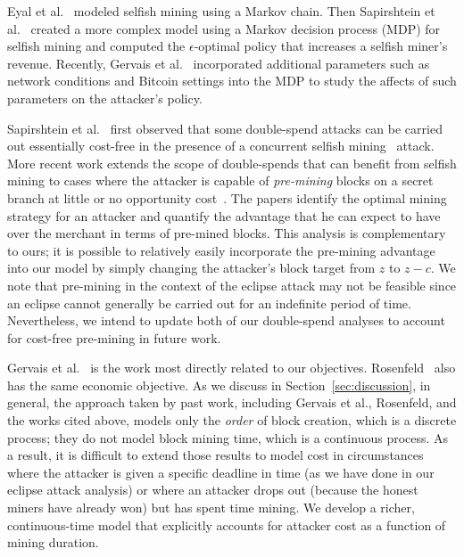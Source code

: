 Eyal et al.~\cite{eyal:2014} modeled selfish mining using a Markov chain. Then Sapirshtein et al.~\cite{sapirshtein:2015} created a more complex model using a Markov decision process (MDP) for selfish mining and computed the $\epsilon$-optimal policy that increases a selfish miner's revenue. Recently, Gervais et al.~\cite{Gervais:2016} incorporated additional parameters such as network conditions and Bitcoin settings into the MDP to study the affects of such parameters on the attacker's policy. %

Sapirshtein et al.~\cite{sapirshtein:2015} first observed that some double-spend attacks can be carried out essentially cost-free in the presence of a concurrent selfish mining~\cite{eyal:2014} attack. 
More recent work extends the scope of double-spends that can benefit from selfish mining to cases where the attacker is capable of \emph{pre-mining} blocks on a secret branch at little or no opportunity cost~\cite{Sompolinsky:2016}. The papers identify the optimal mining strategy for an attacker and quantify the advantage that he can expect to have over the merchant in terms of pre-mined blocks.
This analysis is complementary to ours; it is possible to relatively easily incorporate the pre-mining advantage into our model by simply changing the attacker's block target from $z$ to $z-c$. We note that pre-mining in the context of the eclipse attack may not be feasible since an eclipse cannot generally be carried out for an indefinite period of time. Nevertheless, we intend to update both of our double-spend analyses to account for cost-free pre-mining in future work.

Gervais et al.~\cite{Gervais:2016} is the work most directly related to our objectives.  Rosenfeld~\cite{Rosenfeld:2012} also has the same economic objective. As we discuss in Section~\ref{sec:discussion}, in general, the approach taken by past work, including Gervais et al., Rosenfeld, and the works cited above, models only the \emph{order} of block creation, which is a discrete process; they do not model block mining time, which is a continuous process. As a result, it is difficult to extend those results to model cost in circumstances where the attacker is given a specific deadline in time (as we have done in our eclipse attack analysis) or where an attacker drops out (because the honest miners have already won) but has spent time mining. We develop a richer, continuous-time model that explicitly accounts
for attacker cost as a function of mining duration.  

